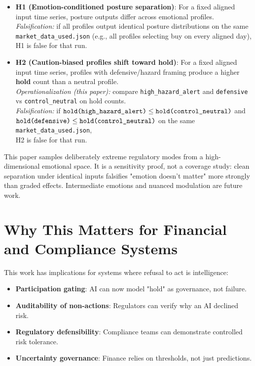 \documentclass[12pt,a4paper]{report}
\begin{document}
\begin{itemize}
	\item \textbf{H1 (Emotion-conditioned posture separation)}: For a fixed aligned input time series, posture outputs differ across emotional profiles.
	\\
	\emph{Falsification:} if all profiles output identical posture distributions on the same \texttt{market\_data\_used.json} (e.g., all profiles selecting buy on every aligned day), H1 is false for that run.
    
\pagebreak

	\item \textbf{H2 (Caution-biased profiles shift toward hold)}: For a fixed aligned input time series, profiles with defensive/hazard framing produce a higher \textbf{hold} count than a neutral profile.
	\\
	\emph{Operationalization (this paper):} compare \texttt{high\_hazard\_alert} and \texttt{defensive} vs \texttt{control\_neutral} on hold counts.
	\\
	\emph{Falsification:} if \(\texttt{hold(high\_hazard\_alert)} \le \\ \texttt{hold(control\_neutral)}\) and \(\texttt{hold(defensive)} \le \\ 
    \texttt{hold(control\_neutral)}\) on the same \texttt{market\_data\_used.json}, \\
    H2 is false for that run.
\end{itemize}

This paper samples deliberately extreme regulatory modes from a high-dimensional emotional space. It is a sensitivity proof, not a coverage study: clean separation under identical inputs falsifies "emotion doesn't matter" more strongly than graded effects. Intermediate emotions and nuanced modulation are future work.

\section{Why This Matters for Financial and Compliance Systems}

This work has implications for systems where refusal to act is intelligence:

\begin{itemize}
	\item \textbf{Participation gating}: AI can now model "hold" as governance, not failure.
	\item \textbf{Auditability of non-actions}: Regulators can verify why an AI declined risk.
	\item \textbf{Regulatory defensibility}: Compliance teams can demonstrate controlled risk tolerance.
	\item \textbf{Uncertainty governance}: Finance relies on thresholds, not just predictions.
\end{itemize}
\end{document}
